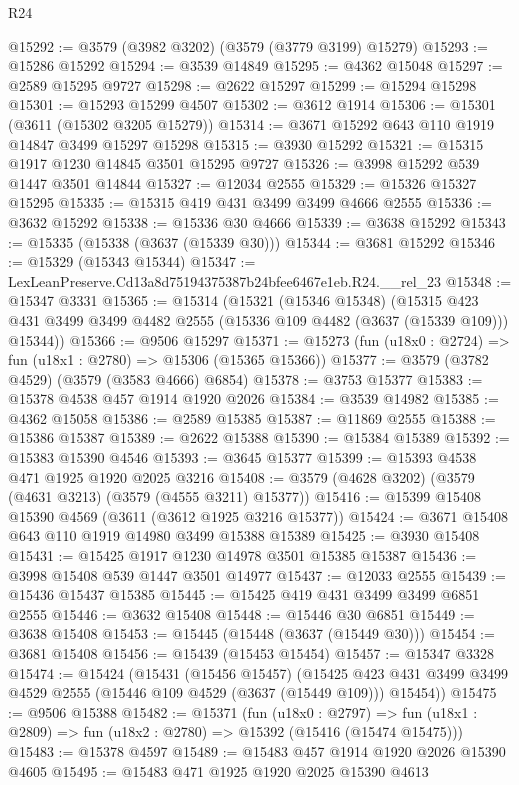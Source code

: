 \begin{lexlean}{R24}
\begin{coremodule}
@15292 := @3579 (@3982 @3202) (@3579 (@3779 @3199) @15279)
@15293 := @15286 @15292
@15294 := @3539 @14849
@15295 := @4362 @15048
@15297 := @2589 @15295 @9727
@15298 := @2622 @15297
@15299 := @15294 @15298
@15301 := @15293 @15299 @4507
@15302 := @3612 @1914
@15306 := @15301 (@3611 (@15302 @3205 @15279))
@15314 := @3671 @15292 @643 @110 @1919 @14847 @3499 @15297 @15298
@15315 := @3930 @15292
@15321 := @15315 @1917 @1230 @14845 @3501 @15295 @9727
@15326 := @3998 @15292 @539 @1447 @3501 @14844
@15327 := @12034 @2555
@15329 := @15326 @15327 @15295
@15335 := @15315 @419 @431 @3499 @3499 @4666 @2555
@15336 := @3632 @15292
@15338 := @15336 @30 @4666
@15339 := @3638 @15292
@15343 := @15335 (@15338 (@3637 (@15339 @30)))
@15344 := @3681 @15292
@15346 := @15329 (@15343 @15344)
@15347 := LexLeanPreserve.Cd13a8d75194375387b24bfee6467e1eb.R24.__rel_23
@15348 := @15347 @3331
@15365 := @15314
    (@15321
      (@15346 @15348)
      (@15315 @423 @431 @3499 @3499 @4482 @2555 (@15336 @109 @4482 (@3637 (@15339 @109))) @15344))
@15366 := @9506 @15297
@15371 := @15273 (fun (u18x0 : @2724) => fun (u18x1 : @2780) => @15306 (@15365 @15366))
@15377 := @3579 (@3782 @4529) (@3579 (@3583 @4666) @6854)
@15378 := @3753 @15377
@15383 := @15378 @4538 @457 @1914 @1920 @2026
@15384 := @3539 @14982
@15385 := @4362 @15058
@15386 := @2589 @15385
@15387 := @11869 @2555
@15388 := @15386 @15387
@15389 := @2622 @15388
@15390 := @15384 @15389
@15392 := @15383 @15390 @4546
@15393 := @3645 @15377
@15399 := @15393 @4538 @471 @1925 @1920 @2025 @3216
@15408 := @3579 (@4628 @3202) (@3579 (@4631 @3213) (@3579 (@4555 @3211) @15377))
@15416 := @15399 @15408 @15390 @4569 (@3611 (@3612 @1925 @3216 @15377))
@15424 := @3671 @15408 @643 @110 @1919 @14980 @3499 @15388 @15389
@15425 := @3930 @15408
@15431 := @15425 @1917 @1230 @14978 @3501 @15385 @15387
@15436 := @3998 @15408 @539 @1447 @3501 @14977
@15437 := @12033 @2555
@15439 := @15436 @15437 @15385
@15445 := @15425 @419 @431 @3499 @3499 @6851 @2555
@15446 := @3632 @15408
@15448 := @15446 @30 @6851
@15449 := @3638 @15408
@15453 := @15445 (@15448 (@3637 (@15449 @30)))
@15454 := @3681 @15408
@15456 := @15439 (@15453 @15454)
@15457 := @15347 @3328
@15474 := @15424
    (@15431
      (@15456 @15457)
      (@15425 @423 @431 @3499 @3499 @4529 @2555 (@15446 @109 @4529 (@3637 (@15449 @109))) @15454))
@15475 := @9506 @15388
@15482 := @15371
    (fun (u18x0 : @2797) =>
    fun (u18x1 : @2809) => fun (u18x2 : @2780) => @15392 (@15416 (@15474 @15475)))
@15483 := @15378 @4597
@15489 := @15483 @457 @1914 @1920 @2026 @15390 @4605
@15495 := @15483 @471 @1925 @1920 @2025 @15390 @4613

\end{coremodule}
\end{lexlean}
